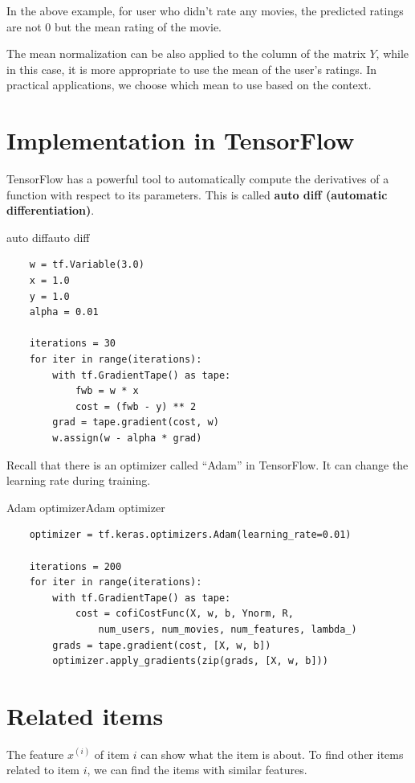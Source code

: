 \begin{notebox}
    \hspace*{2em}In the above example, for user who didn't rate any movies, the predicted ratings are not 0 but the mean rating of the movie.

    \hspace*{2em}The mean normalization can be also applied to the column of the matrix $Y$, while in this case, it is more appropriate to use the mean of the user's ratings.
    In practical applications, we choose which mean to use based on the context.
\end{notebox}

\section{Implementation in TensorFlow}
TensorFlow has a powerful tool to automatically compute the derivatives of a function with respect to its parameters.
This is called \textbf{auto diff (automatic differentiation)}.

\begin{codebox}{auto diff}{auto diff}
\begin{verbatim}
    w = tf.Variable(3.0)
    x = 1.0
    y = 1.0
    alpha = 0.01

    iterations = 30
    for iter in range(iterations):
        with tf.GradientTape() as tape:
            fwb = w * x
            cost = (fwb - y) ** 2
        grad = tape.gradient(cost, w)
        w.assign(w - alpha * grad)
\end{verbatim}
\end{codebox}

Recall that there is an optimizer called ``Adam'' in TensorFlow. It can change the learning rate during training.

\begin{codebox}{Adam optimizer}{Adam optimizer}
\begin{verbatim}
    optimizer = tf.keras.optimizers.Adam(learning_rate=0.01)

    iterations = 200
    for iter in range(iterations):
        with tf.GradientTape() as tape:
            cost = cofiCostFunc(X, w, b, Ynorm, R, 
                num_users, num_movies, num_features, lambda_)
        grads = tape.gradient(cost, [X, w, b])
        optimizer.apply_gradients(zip(grads, [X, w, b]))
\end{verbatim}
\end{codebox}

\section{Related items}
The feature $x^{(i)}$ of item $i$ can show what the item is about.
To find other items related to item $i$, we can find the items with similar features.

